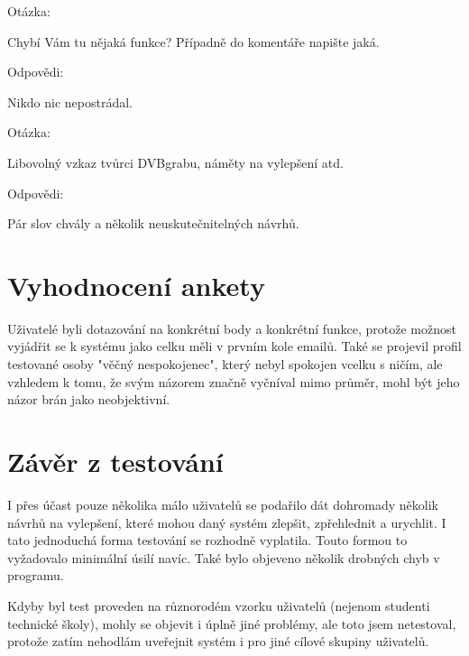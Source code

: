 \vspace{10pt}

\begin{bf}Otázka:\end{bf} Chybí Vám tu nějaká funkce? Případně do komentáře napište jaká.

\begin{bf}Odpovědi:\end{bf} Nikdo nic nepostrádal.
				
\vspace{10pt}

\begin{bf}Otázka:\end{bf} Libovolný vzkaz tvůrci DVBgrabu, náměty na vylepšení atd.

\begin{bf}Odpovědi:\end{bf} Pár slov chvály a několik neuskutečnitelných návrhů.

\vspace{10pt}

\section{Vyhodnocení ankety}

Uživatelé byli dotazování na konkrétní body a konkrétní funkce, protože možnost vyjádřit se k systému jako celku měli v prvním kole emailů. Také se projevil profil testované osoby "věčný nespokojenec", který nebyl spokojen vcelku s ničím, ale vzhledem k tomu, že svým názorem značně vyčníval mimo průměr, mohl být jeho názor brán jako neobjektivní.

\vspace{10pt}

\section{Závěr z testování}

I přes účast pouze několika málo uživatelů se podařilo dát dohromady několik návrhů na vylepšení, které mohou daný systém zlepšit, zpřehlednit a urychlit. I tato jednoduchá forma testování se rozhodně vyplatila. Touto formou to vyžadovalo minimální úsilí navíc. Také bylo objeveno několik drobných chyb v programu.

\vspace{10pt}

Kdyby byl test proveden na různorodém vzorku uživatelů (nejenom studenti technické školy), mohly se objevit i úplně jiné problémy, ale toto jsem netestoval, protože zatím nehodlám uveřejnit systém i pro jiné cílové skupiny uživatelů.
